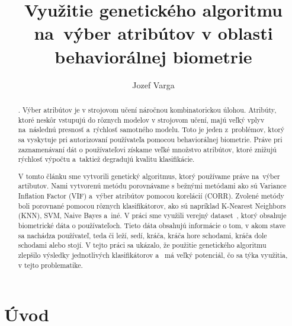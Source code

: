 \documentclass[runningheads]{llncs}
\newcommand\tab[1][0.5cm]{\hspace*{#1}}
\begin{document}
%
\title{Využitie genetického algoritmu na~výber atribútov v oblasti behaviorálnej biometrie}
%
%
\author{Jozef Varga}
%
%
\maketitle              %
%
\begin{abstract}
    . Výber atribútov je v strojovom učení náročnou kombinatorickou úlohou. 
    Atribúty, ktoré neskôr vstupujú do rôznych modelov v strojovom učení, majú
    veľký vplyv na~následnú presnosť a~rýchlosť samotného modelu. Toto je jeden z~problémov,
    ktorý sa vyskytuje pri autorizovaní používateľa pomocou behaviorálnej biometrie. Práve pri
    zaznamenávaní dát o používateľovi získame veľké množstvo atribútov, ktoré znižujú rýchlosť výpočtu
    a~taktiež degradujú kvalitu klasifikácie. 
    
    \tab V tomto článku sme vytvorili genetický algoritmus, ktorý používame práve na~výber artibutov. Nami vytvorenú
    metódu porovnávame s bežnými metódami ako sú Variance Inflation Factor (VIF) a~výber atribútov pomocou korelácií (CORR). 
    Zvolené metódy boli porovnané pomocou rôznych klasifikátorov, ako sú napríklad K-Nearest Neighbors (KNN), SVM, Naive Bayes a~iné. 
    V práci sme využili verejný dataset~\cite{ref_dataset_anguita,ref_dataset}, ktorý obsahuje biometrické dáta o 
    používateľoch. Tieto dáta obsahujú informácie o tom, v akom stave sa nachádza používateľ, teda či leží, sedí, 
    kráča,  kráča hore schodami, kráča dole schodami alebo stojí.
    V tejto práci sa ukázalo, že použitie genetického algoritmu zlepšilo výsledky jednotlivých klasifikátorov a~
    má veľký potenciál, čo sa týka využitia, v tejto problematike.

\end{abstract}
%

\section{Úvod}
\end{document}
